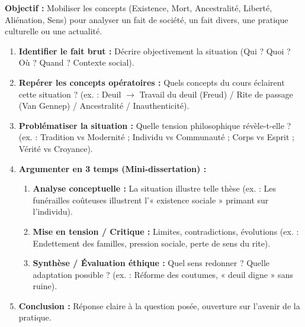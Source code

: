 \documentclass[11pt]{article}
\begin{document}
\begin{methode}
\textbf{Objectif :} Mobiliser les concepts (Existence, Mort, Ancestralité, Liberté, Aliénation, Sens) pour analyser un fait de société, un fait divers, une pratique culturelle ou une actualité.
\begin{enumerate}
    \item \textbf{Identifier le fait brut :} Décrire objectivement la situation (Qui ? Quoi ? Où ? Quand ? Contexte social).
    \item \textbf{Repérer les concepts opératoires :} Quels concepts du cours éclairent cette situation ? (ex. : Deuil $\to$ Travail du deuil (Freud) / Rite de passage (Van Gennep) / Ancestralité / Inauthenticité).
    \item \textbf{Problématiser la situation :} Quelle tension philosophique révèle-t-elle ? (ex. : Tradition vs Modernité ; Individu vs Communauté ; Corps vs Esprit ; Vérité vs Croyance).
    \item \textbf{Argumenter en 3 temps (Mini-dissertation) :}
    \begin{enumerate}
        \item \textbf{Analyse conceptuelle :} La situation illustre telle thèse (ex. : Les funérailles coûteuses illustrent l'« existence sociale » primant sur l'individu).
        \item \textbf{Mise en tension / Critique :} Limites, contradictions, évolutions (ex. : Endettement des familles, pression sociale, perte de sens du rite).
        \item \textbf{Synthèse / Évaluation éthique :} Quel sens redonner ? Quelle adaptation possible ? (ex. : Réforme des coutumes, « deuil digne » sans ruine).
    \end{enumerate}
    \item \textbf{Conclusion :} Réponse claire à la question posée, ouverture sur l'avenir de la pratique.
\end{enumerate}
\end{methode}
\end{document}
